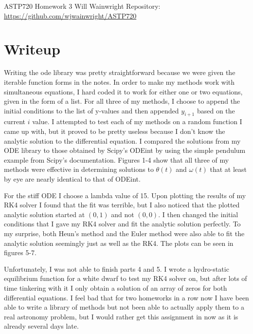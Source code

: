 \documentclass[twocolumn,11pt]{article}
\begin{document}
\pagestyle{plain}
\onecolumn
ASTP720 
\newline Homework 3
\newline Will Wainwright
\newline Repository: \href{https://github.com/wjwainwright/ASTP720}{https://github.com/wjwainwright/ASTP720}

\section*{Writeup}
Writing the ode library was pretty straightforward because we were given the iterable function forms in the notes. In order to make my methods work with simultaneous equations, I hard coded it to work for either one or two equations, given in the form of a list. For all three of my methods, I choose to append the initial conditions to the list of y-values and then appended $y_{i+1}$ based on the current $i$ value. I attempted to test each of my methods on a random function I came up with, but it proved to be pretty useless because I don't know the analytic solution to the differential equation. I compared the solutions from my ODE library to those obtained by Scipy's ODEint by using the simple pendulum example from Scipy's documentation. Figures 1-4 show that all three of my methods were effective in determining solutions to $\theta(t)$ and $\omega(t)$ that at least by eye are nearly identical to that of ODEint.

For the stiff ODE I choose a lambda value of 15. Upon plotting the results of my RK4 solver I found that the fit was terrible, but I also noticed that the plotted analytic solution started at $(0,1)$ and not $(0,0)$. I then changed the initial conditions that I gave my RK4 solver and fit the analytic solution perfectly. To my surprise, both Heun's method and the Euler method were also able to fit the analytic solution seemingly just as well as the RK4. The plots can be seen in figures 5-7.

Unfortunately, I was not able to finish parts 4 and 5. I wrote a hydro-static equilibrium function for a white dwarf to test my RK4 solver on, but after lots of time tinkering with it I only obtain a solution of an array of zeros for both differential equations. I feel bad that for two homeworks in a row now I have been able to write a library of methods but not been able to actually apply them to a real astronomy problem, but I would rather get this assignment in now as it is already several days late. 
\end{document}
